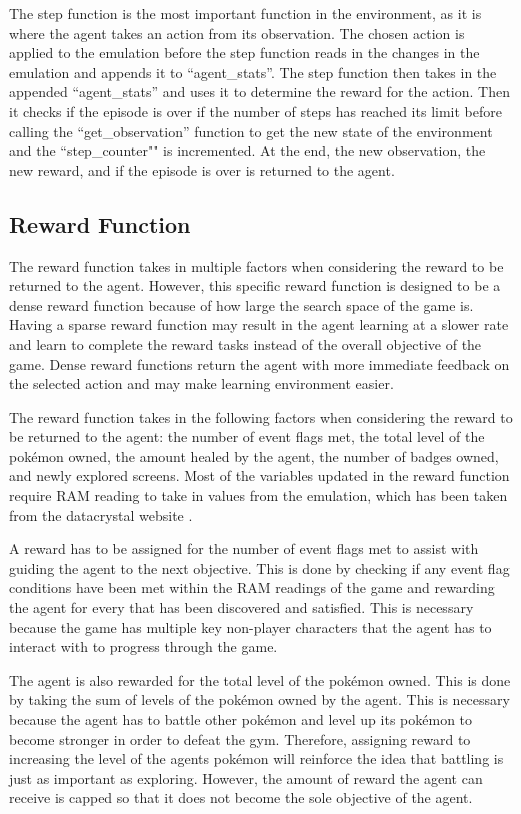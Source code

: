 The step function is the most important function in the environment, as it is where the agent takes an action from its observation. The chosen action is applied to the emulation before the step function reads in the changes in the emulation and appends it to ``agent\_stats''. The step function then takes in the appended ``agent\_stats'' and uses it to determine the reward for the action. Then it checks if the episode is over if the number of steps has reached its limit before calling the ``get\_observation'' function to get the new state of the environment and the ``step\_counter"" is incremented. At the end, the new observation, the new reward, and if the episode is over is returned to the agent.

\subsection{Reward Function}

The reward function takes in multiple factors when considering the reward to be returned to the agent. However, this specific reward function is designed to be a dense reward function because of how large the search space of the game is. Having a sparse reward function may result in the agent learning at a slower rate and learn to complete the reward tasks instead of the overall objective of the game. Dense reward functions return the agent with more immediate feedback on the selected action and may make learning environment easier. 

The reward function takes in the following factors when considering the reward to be returned to the agent: the number of event flags met, the total level of the pokémon owned, the amount healed by the agent, the number of badges owned, and newly explored screens. Most of the variables updated in the reward function require RAM reading to take in values from the emulation, which has been taken from the datacrystal website \cite{datacrystal}.

A reward has to be assigned for the number of event flags met to assist with guiding the agent to the next objective. This is done by checking if any event flag conditions have been met within the RAM readings of the game and rewarding the agent for every that has been discovered and satisfied. This is necessary because the game has multiple key non-player characters that the agent has to interact with to progress through the game. 

The agent is also rewarded for the total level of the pokémon owned. This is done by taking the sum of levels of the pokémon owned by the agent. This is necessary because the agent has to battle other pokémon and level up its pokémon to become stronger in order to defeat the gym. Therefore, assigning reward to increasing the level of the agents pokémon will reinforce the idea that battling is just as important as exploring. However, the amount of reward the agent can receive is capped so that it does not become the sole objective of the agent. 


